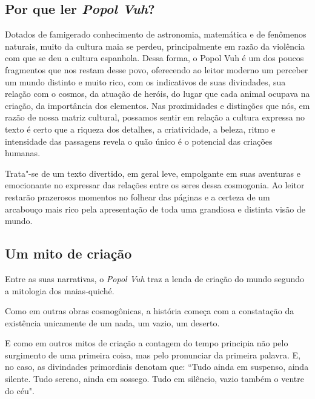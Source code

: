 \documentclass[11pt]{extarticle}
\begin{document}
 
\subsection{Por que ler \textit{Popol Vuh}?}

Dotados de famigerado conhecimento de astronomia, matemática e de
fenômenos naturais, muito da cultura maia se perdeu, principalmente em
razão da violência com que se deu a cultura espanhola. Dessa forma, o
Popol Vuh é um dos poucos fragmentos que nos restam desse povo,
oferecendo ao leitor moderno um perceber um mundo distinto e muito rico,
com os indicativos de suas divindades, sua relação com o cosmos, da
atuação de heróis, do lugar que cada animal ocupava na criação, da
importância dos elementos. Nas proximidades e distinções que nós, em
razão de nossa matriz cultural, possamos sentir em relação a cultura
expressa no texto é certo que a riqueza dos detalhes, a criatividade, a
beleza, ritmo e intensidade das passagens revela o quão único é o
potencial das criações humanas.

Trata"-se de um texto divertido, em geral leve, empolgante em suas
aventuras e emocionante no expressar das relações entre os seres dessa
cosmogonia. Ao leitor restarão prazerosos momentos no folhear das páginas
e a certeza de um arcabouço mais rico pela apresentação de toda uma
grandiosa e distinta visão de mundo.

\subsection{Um mito de criação}

Entre as suas narrativas, o \textit{Popol Vuh} traz a lenda de criação do mundo
segundo a mitologia dos maias-quiché.

Como em outras obras cosmogônicas, a história começa com a constatação
da existência unicamente de um nada, um vazio, um deserto.

E como em outros mitos de criação a contagem do tempo principia não pelo
surgimento de uma primeira coisa, mas pelo pronunciar da primeira
palavra. E, no caso, as divindades primordiais denotam que: ``Tudo ainda
em suspenso, ainda silente. Tudo sereno, ainda em sossego. Tudo em
silêncio, vazio também o ventre do céu".




\end{document}
